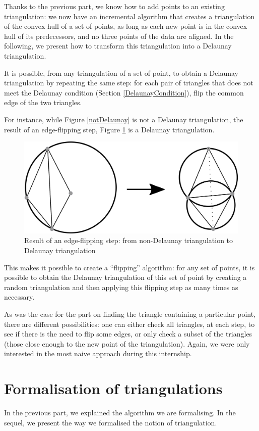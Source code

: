 \documentclass[a4paper,10pt]{article}
\begin{document}
Thanks to the previous part, we know how to add points to an existing triangulation: we now have an incremental algorithm that creates a triangulation of the convex hull of a set of points, as long as each new point is in the convex hull of its predecessors, and no three points of the data are aligned. In the following, we present how to transform this triangulation into a Delaunay triangulation.

It is possible, from any triangulation of a set of point, to obtain a Delaunay triangulation by repeating the same step: for each pair of triangles that does not meet the Delaunay condition (Section \ref{DelaunayCondition}), flip the common edge of the two triangles.

For instance, while Figure \ref{notDelaunay} is not a Delaunay triangulation, the result of an edge-flipping step, Figure \ref{DelaunayTriangulation} is a Delaunay triangulation.
\begin{figure}
\centering
\includegraphics[scale=1]{dessin1}
\caption{\label{DelaunayTriangulation} Result of an edge-flipping step: from non-Delaunay triangulation to Delaunay triangulation}
\end{figure}
This makes it possible to create a ``flipping'' algorithm: for any set of points, it is possible to obtain the Delaunay triangulation of this set of point by creating a random triangulation and then applying this flipping step as many times as necessary.

As was the case for the part on finding the triangle containing a particular point, there are different possibilities: one can either check all triangles, at each step, to see if there is the need to flip some edges, or only check a subset of the triangles (those close enough to the new point of the triangulation). Again, we were only interested in the most naive approach during this internship.
\section{Formalisation of triangulations}
\label{formalisation}
In the previous part, we explained the algorithm we are formalising. In the sequel, we present the way we formalised the notion of triangulation.
\end{document}
